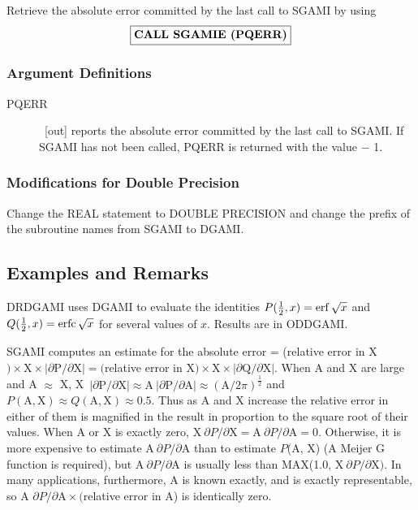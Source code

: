 \documentclass[twoside]{MATH77}
\begin{document}
Retrieve the absolute error committed by the last call to SGAMI by using
$$
\fbox{{\bf CALL SGAMIE (PQERR)}}
$$

\subsubsection{Argument Definitions}

\begin{description}
\item[PQERR]  \ [out] reports the absolute error committed by the last call
to SGAMI. If SGAMI has not been called, PQERR is returned with the value $-$%
1.
\end{description}

\subsubsection{Modifications for Double Precision}

Change the REAL statement to DOUBLE PRECISION and change the prefix of the
subroutine names from SGAMI to DGAMI.

\subsection{Examples and Remarks}

DRDGAMI uses DGAMI to evaluate the identities $P(\frac 12,x) = \erf \sqrt x$
and $Q(\frac 12,x) = \erfc \sqrt x$ for several values of $x.$
Results are in ODDGAMI.

SGAMI computes an estimate for the absolute error = (relative error in X$)
\times \text{X} \times |\partial \text{P}/\partial \text{X}| = ($relative
error in X$) \times \text{X} \times |\partial \text{Q}/\partial \text{X}|$.
When A and X are large and A $\approx $ X, X\ $|\partial \text{P}/\partial
\text{X}| \approx \text{A}\ |\partial \text{P}/\partial \text{A}| \approx (%
\text{A}/2\pi )^{\frac 12}$ and $P(\text{A},\text{X}) \approx Q(\text{A},%
\text{X}) \approx 0.5$. Thus as A and X increase the relative error in either
of them is magnified in the result in proportion to the square root of their
values. When A or X is exactly zero, X$\ \partial P/\partial \text{X} =
\text{A}\ \partial P/\partial \text{A} = 0$. Otherwise, it is more expensive
to estimate A$\ \partial P/\partial \text{A}$ than to estimate $P$(A, X) (A
Meijer G function is required), but A$\ \partial P/\partial \text{A}$ is
usually less than MAX(1.0, X$\ \partial P/\partial \text{X})$. In many
applications, furthermore, A is known exactly, and is exactly representable,
so A $\partial P/\partial \text{A} \times ($relative error in A) is
identically zero.
\end{document}
